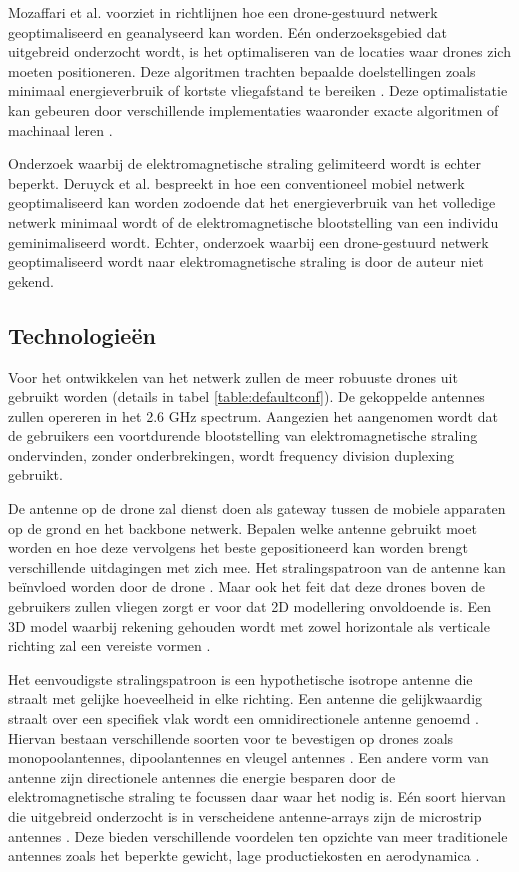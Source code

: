 \documentclass[twocolumn]{phdsymp_dutch}
\begin{document}
Mozaffari et al. voorziet in \cite{U3} richtlijnen hoe een drone-gestuurd netwerk geoptimaliseerd en geanalyseerd kan worden.
Eén onderzoeksgebied dat uitgebreid onderzocht wordt, is het optimaliseren van de locaties waar drones zich moeten positioneren.
Deze algoritmen trachten bepaalde doelstellingen zoals minimaal energieverbruik of kortste vliegafstand te bereiken \cite{U6,U7,U8,U9}.
Deze optimalistatie kan gebeuren door verschillende implementaties waaronder exacte algoritmen of machinaal leren \cite{U3,U5}.

Onderzoek waarbij de elektromagnetische straling gelimiteerd wordt is echter beperkt.
Deruyck et al. bespreekt in \cite{J1} hoe een conventioneel mobiel netwerk geoptimaliseerd kan worden zodoende dat het energieverbruik 
van het volledige netwerk minimaal wordt of de elektromagnetische blootstelling van een individu geminimaliseerd wordt.
Echter, onderzoek waarbij een drone-gestuurd netwerk geoptimaliseerd wordt naar elektromagnetische straling is 
door de auteur niet gekend.

\subsection{Technologie\"en}
Voor het ontwikkelen van het netwerk zullen de meer robuuste drones uit \cite{J2} gebruikt worden (details in tabel \ref{table:defaultconf}). De 
gekoppelde antennes zullen opereren in het 2.6 GHz spectrum. Aangezien het aangenomen wordt dat de gebruikers een voortdurende blootstelling
van  elektromagnetische straling ondervinden, zonder onderbrekingen, wordt frequency division duplexing gebruikt. 

De antenne op de drone zal dienst doen als gateway tussen de mobiele apparaten op de grond en het backbone netwerk.
Bepalen welke antenne gebruikt moet worden en hoe deze vervolgens het beste gepositioneerd kan worden brengt 
verschillende uitdagingen met zich mee. Het stralingspatroon van de antenne kan be\"invloed worden door de drone \cite{A1}.
Maar ook het feit dat deze drones boven de gebruikers zullen vliegen zorgt er voor dat 2D modellering onvoldoende is.
Een 3D model waarbij rekening gehouden wordt met zowel horizontale als verticale richting zal een vereiste vormen \cite{U12}.

Het eenvoudigste stralingspatroon is een hypothetische isotrope antenne die straalt met gelijke hoeveelheid in elke richting.
Een antenne die gelijkwaardig straalt over een specifiek vlak wordt een omnidirectionele antenne genoemd 
\cite{U12}. Hiervan bestaan verschillende soorten voor te bevestigen op drones zoals monopoolantennes, dipoolantennes en vleugel antennes \cite{A4,A10,A11,A12}.
Een andere vorm van antenne zijn directionele antennes die energie besparen door de elektromagnetische straling 
te focussen daar waar het nodig is. Eén soort hiervan die uitgebreid onderzocht is in verscheidene antenne-arrays 
zijn de microstrip antennes \cite{A5,A6,A8}.
Deze bieden verschillende voordelen ten opzichte van meer traditionele antennes 
zoals het beperkte gewicht, lage productiekosten en aerodynamica \cite{J13_microstripadvantages,J14_antennadesign}.
\end{document}
